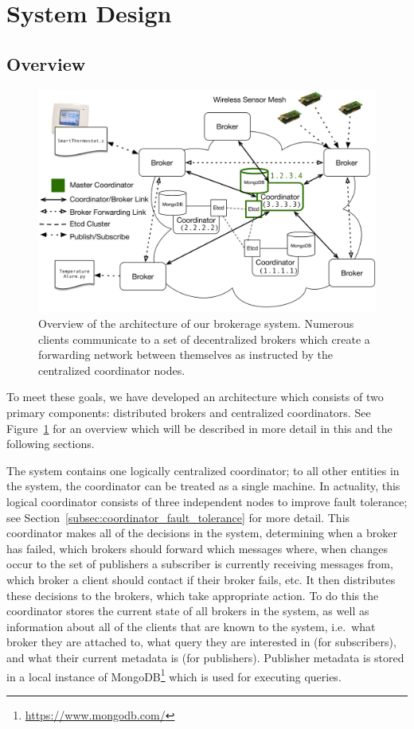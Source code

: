 \section{System Design}
\label{section:coordinator}

\subsection{Overview}

\begin{figure}[t]
\centering
\includegraphics[width=.7\linewidth]{figs/full_architecture.pdf}
\caption{Overview of the architecture of our brokerage system.
Numerous clients communicate to a set of decentralized brokers which create a forwarding network between themselves as instructed by the centralized coordinator nodes.}
\label{fig:architecture}
\end{figure}

To meet these goals, we have developed an architecture which consists of two primary components: distributed brokers and centralized coordinators.
See Figure~\ref{fig:architecture} for an overview which will be described in more detail in this and the following sections.

The system contains one logically centralized coordinator; to all other entities in the system, the coordinator can be treated as a single machine.
In actuality, this logical coordinator consists of three independent nodes to improve fault tolerance; see Section~\ref{subsec:coordinator_fault_tolerance} for more detail.
This coordinator makes all of the decisions in the system, determining when a broker has failed, which brokers should forward which messages where, when changes occur to the set of publishers a subscriber is currently receiving messages from, which broker a client should contact if their broker fails, etc.
It then distributes these decisions to the brokers, which take appropriate action.
To do this the coordinator stores the current state of all brokers in the system, as well as information about all of the clients that are known to the system, i.e.\ what broker they are attached to, what query they are interested in (for subscribers), and what their current metadata is (for publishers).
Publisher metadata is stored in a local instance of MongoDB\footnote{\url{https://www.mongodb.com/}} which is used for executing queries.

